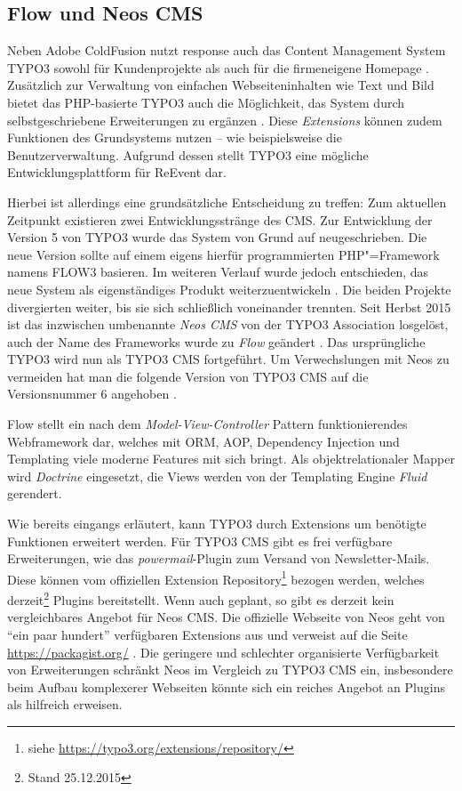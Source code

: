 \subsection{Flow und Neos CMS}

Neben Adobe ColdFusion nutzt response auch das Content Management System TYPO3 sowohl für Kundenprojekte als auch für die firmeneigene Homepage \cite{responseinformationsdesigngmbh&co.kg.}. Zusätzlich zur Verwaltung von einfachen Webseiteninhalten wie Text und Bild bietet das PHP-basierte TYPO3 auch die Möglichkeit, das System durch selbstgeschriebene Erweiterungen zu ergänzen \cite[S. IX]{Rau.2014}. Diese \emph{Extensions} können zudem Funktionen des Grundsystems nutzen -- wie beispielsweise die Benutzerverwaltung. Aufgrund dessen stellt TYPO3 eine mögliche Entwicklungsplattform für ReEvent dar.

Hierbei ist allerdings eine grundsätzliche Entscheidung zu treffen: Zum aktuellen Zeitpunkt existieren zwei Entwicklungsstränge des CMS. Zur Entwicklung der Version 5 von TYPO3 wurde das System von Grund auf neugeschrieben. Die neue Version sollte auf einem eigens hierfür programmierten PHP"=Framework namens FLOW3 basieren. Im weiteren Verlauf wurde jedoch entschieden, das neue System als eigenständiges Produkt weiterzuentwickeln \cite[S. X]{Rau.2014}. Die beiden Projekte divergierten weiter, bis sie sich schließlich voneinander trennten. Seit Herbst 2015 ist das inzwischen umbenannte \emph{Neos CMS} von der TYPO3 Association losgelöst, auch der Name des Frameworks wurde zu \emph{Flow} geändert \cite{NeosCMS.2015b}. Das ursprüngliche TYPO3 wird nun als TYPO3 CMS fortgeführt. Um Verwechslungen mit Neos zu vermeiden hat man die folgende Version von TYPO3 CMS auf die Versionsnummer 6 angehoben \cite[S. XIII]{Rau.2014}.

Flow stellt ein nach dem \emph{Model-View-Controller} Pattern funktionierendes Webframework dar, welches mit ORM, AOP, Dependency Injection und Templating viele moderne Features mit sich bringt. Als objektrelationaler Mapper wird \emph{Doctrine} eingesetzt, die Views werden von der Templating Engine \emph{Fluid} gerendert.

Wie bereits eingangs erläutert, kann TYPO3 durch Extensions um benötigte Funktionen erweitert werden. Für TYPO3 CMS gibt es frei verfügbare Erweiterungen, wie das \emph{powermail}-Plugin zum Versand von Newsletter-Mails. Diese können vom offiziellen Extension Repository\footnote{siehe \url{https://typo3.org/extensions/repository/}} bezogen werden, welches derzeit\footnote{Stand 25.12.2015}  Plugins bereitstellt. Wenn auch geplant, so gibt es derzeit kein vergleichbares Angebot für Neos CMS. Die offizielle Webseite von Neos geht von \enquote{ein paar hundert} verfügbaren Extensions aus und verweist auf die Seite \url{https://packagist.org/} \cite{NeosCMS.2015}. Die geringere und schlechter organisierte Verfügbarkeit von Erweiterungen schränkt Neos im Vergleich zu TYPO3 CMS ein, insbesondere beim Aufbau komplexerer Webseiten könnte sich ein reiches Angebot an Plugins als hilfreich erweisen.

